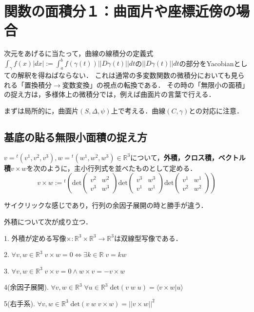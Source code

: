 \documentclass[uplatex, dvipdfmx]{jsreport}
\begin{document}
\section{関数の面積分１：曲面片や座標近傍の場合}

次元をあげるに当たって，曲線の線積分の定義式$\int_\gamma f(x)|dx|:=\int^b_af(\gamma(t))||D\gamma(t)||dt$の$||D\gamma(t)||dt$の部分をYacobianとしての解釈を得ねばならない．
これは通常の多変数関数の微積分においても見られる「置換積分$\to$変数変換」の視点の転換である．
その時の「無限小の面積」の捉え方は，多様体上の微積分では，例えば曲面片の言葉で行える．

まずは局所的に，曲面片$(S,\Delta,\psi)$上で考える．曲線$(C,\gamma)$との対応に注意．

\subsection{基底の貼る無限小面積の捉え方}

\begin{definition}[外積]
    $v={}^t(v^1,v^2,v^3),w={}^t(w^1,w^2,w^3)\in\mathbb{R}^3$について，\textbf{外積，クロス積，ベクトル積}$v\times w$を次のように，主小行列式を並べたものとして定める．
    \[ v\times w := {}^t\left( \mathrm{det}\left(\begin{array}{cc} v^2 & w^2 \\ v^3 & w^3 \end{array}\right) \mathrm{det}\left(\begin{array}{cc} v^3 & w^3 \\ v^1 & w^1 \end{array}\right) \mathrm{det}\left(\begin{array}{cc} v^1 & w^1 \\ v^2 & w^2 \end{array}\right) \right) \]
\end{definition}
\begin{remark*}
    サイクリックな感じであり，行列の余因子展開の時と勝手が違う．
\end{remark*}

外積について次が成り立つ．
\begin{theorem}[外積の性質]
    1. 外積が定める写像$\times:\mathbb{R}^3\times\mathbb{R}^3\to\mathbb{R}^3$は双線型写像である．

    2. $\forall v,w\in\mathbb{R}^3\; v\times w=0\Leftrightarrow \exists k\in\mathbb{R}\; v=kw$

    3. $\forall v,w\in\mathbb{R}^3\; v\times v=0 \land w\times v=-v\times w$

    4(余因子展開). $\forall v,w\in\mathbb{R}^3\; \forall u\in\mathbb{R}^3\; \mathrm{det}(v\;w\;u)=\langle v\times w|u\rangle$

    5(右手系). $\forall v,w\in\mathbb{R}^3\; \mathrm{det}(v\; w\; v\times w)=||v\times w||^2$
\end{theorem}
\end{document}
